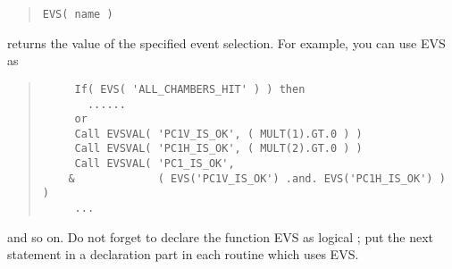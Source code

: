 \begin{enumerate}
\begin{quote}
\begin{verbatim}
EVS( name )
\end{verbatim}\end{quote}
returns the value of the specified event selection.
For example, you can use EVS as
\begin{quote}\baselineskip 3.2mm\begin{verbatim}
     If( EVS( 'ALL_CHAMBERS_HIT' ) ) then                           
       ......                                                       
     or                                                             
     Call EVSVAL( 'PC1V_IS_OK', ( MULT(1).GT.0 ) )                  
     Call EVSVAL( 'PC1H_IS_OK', ( MULT(2).GT.0 ) )                  
     Call EVSVAL( 'PC1_IS_OK',                                      
    &             ( EVS('PC1V_IS_OK') .and. EVS('PC1H_IS_OK') ) )   
     ...                                                            
\end{verbatim}\end{quote}
and so on.                                                     
Do not forget to declare the function EVS as logical ;         
put the next statement in a declaration part in each routine   
which uses EVS.                                                     
\end{enumerate}






